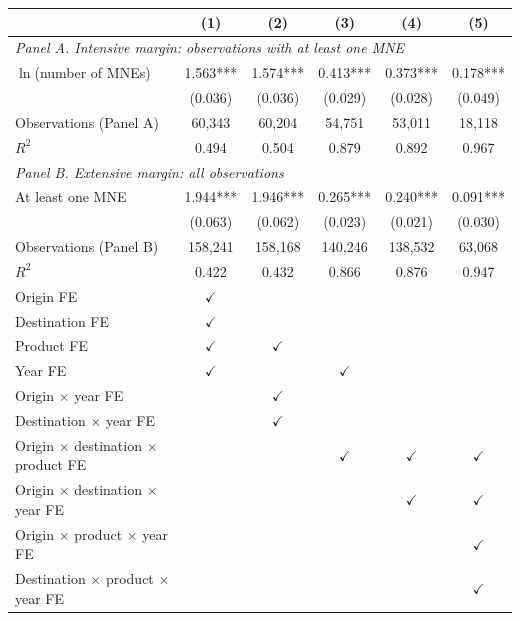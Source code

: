 \begin{tabular}{l*{5}{c}}
\toprule
 & (1) & (2) & (3) & (4) & (5) \\
\midrule
\multicolumn{6}{l}{\textit{Panel A. Intensive margin: observations with at least one MNE}} \\
$\ln$(number of MNEs) & 1.563*** & 1.574*** & 0.413*** & 0.373*** & 0.178*** \\
 & (0.036) & (0.036) & (0.029) & (0.028) & (0.049) \\
Observations (Panel A) & 60,343 & 60,204 & 54,751 & 53,011 & 18,118 \\
$R^2$ & 0.494 & 0.504 & 0.879 & 0.892 & 0.967 \\
\midrule
\multicolumn{6}{l}{\textit{Panel B. Extensive margin: all observations}} \\
At least one MNE & 1.944*** & 1.946*** & 0.265*** & 0.240*** & 0.091*** \\
 & (0.063) & (0.062) & (0.023) & (0.021) & (0.030) \\
Observations (Panel B) & 158,241 & 158,168 & 140,246 & 138,532 & 63,068 \\
$R^2$ & 0.422 & 0.432 & 0.866 & 0.876 & 0.947 \\
\midrule
Origin FE & $\checkmark$ &  &  &  &  \\
Destination FE & $\checkmark$ &  &  &  &  \\
Product FE & $\checkmark$ & $\checkmark$ &  &  &  \\
Year FE & $\checkmark$ &  & $\checkmark$ &  &  \\
Origin $\times$ year FE &  & $\checkmark$ &  &  &  \\
Destination $\times$ year FE &  & $\checkmark$ &  &  &  \\
Origin $\times$ destination $\times$ product FE &  &  & $\checkmark$ & $\checkmark$ & $\checkmark$ \\
Origin $\times$ destination $\times$ year FE &  &  &  & $\checkmark$ & $\checkmark$ \\
Origin $\times$ product $\times$ year FE &  &  &  &  & $\checkmark$ \\
Destination $\times$ product $\times$ year FE &  &  &  &  & $\checkmark$ \\
\bottomrule
\end{tabular}

